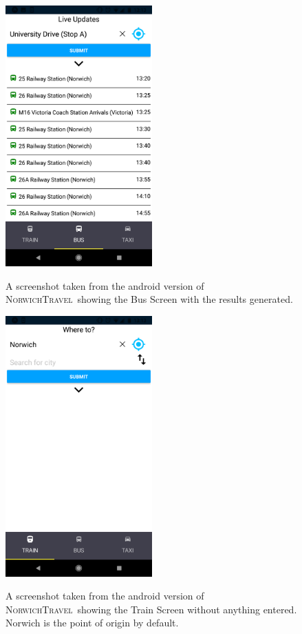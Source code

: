 \documentclass[cmpstyle]{ueacmpstyle}
\newcommand{\nt}{\textsc{NorwichTravel}}
\begin{document}
		\begin{figure}[h]
			\centering
			\includegraphics[height=10cm]{images/android-bus-2.png}\\
			\caption{A screenshot taken from the android version of \nt \ showing the Bus Screen with the results generated.}\label{fig:android-bus-2}
		\end{figure}
		\begin{figure}[h]
			\centering
			\includegraphics[height=10cm]{images/android-train-1.png}\\
			\caption{A screenshot taken from the android version of \nt \ showing the Train Screen without anything entered. Norwich is the point of origin by default.}\label{fig:android-train-1}
		\end{figure}
\end{document}
